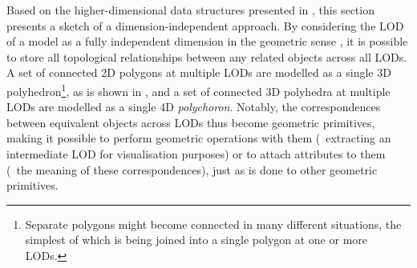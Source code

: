 Based on the higher-dimensional data structures presented in , this section presents a sketch of a dimension-independent approach.
By considering the LOD of a model as a fully independent dimension in the geometric sense \citep{vanOosterom10,Paul11,Stoter12}, it is possible to store all topological relationships between any related objects across all LODs.
A set of connected 2D polygons at multiple LODs are modelled as a single 3D polyhedron\footnote{Separate polygons might become connected in many different situations, the simplest of which is being joined into a single polygon at one or more LODs.}, as is shown in , and a set of connected 3D polyhedra at multiple LODs are modelled as a single 4D \emph{polychoron}.
Notably, the correspondences between equivalent objects across LODs thus become geometric primitives, making it possible to perform geometric operations with them (\eg\ extracting an intermediate LOD for visualisation purposes) or to attach attributes to them (\eg\ the meaning of these correspondences), just as is done to other geometric primitives.

